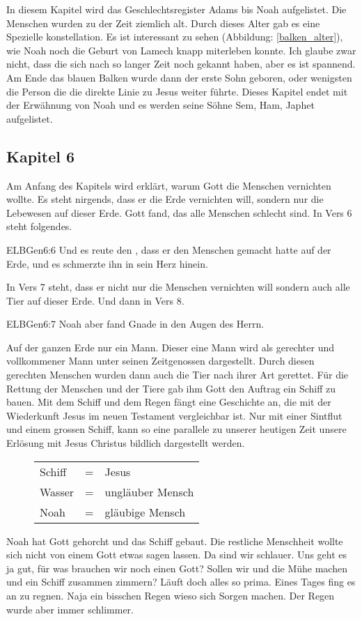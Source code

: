 In diesem Kapitel wird das Geschlechtsregister Adams bis Noah aufgelistet. Die Menschen wurden zu der Zeit ziemlich alt. Durch dieses Alter gab es eine Spezielle konstellation.
Es ist interessant zu sehen (Abbildung: \ref{balken_alter}), wie Noah noch die Geburt von Lamech knapp miterleben konnte. Ich glaube zwar nicht, dass die sich nach so langer Zeit noch gekannt haben, aber es ist spannend. Am Ende das blauen Balken wurde dann der erste Sohn geboren, oder wenigsten die Person die die direkte Linie zu Jesus weiter führte.
Dieses Kapitel endet mit der Erwähnung von Noah und es werden seine Söhne Sem, Ham, Japhet aufgelistet.
\subsection{Kapitel 6}
Am Anfang des Kapitels wird erklärt, warum Gott die Menschen vernichten wollte. Es steht nirgends, dass er die Erde vernichten will, sondern nur die Lebewesen auf dieser Erde. Gott fand, das alle Menschen schlecht sind. In Vers 6 steht folgendes.
\begin{bibeltext}{ELB}{Gen}{6:6}
	Und es reute den \herr , dass er den Menschen gemacht hatte auf der Erde, und es schmerzte ihn in sein Herz hinein.
\end{bibeltext}
In Vers 7 steht, dass er nicht nur die Menschen vernichten will sondern auch alle Tier auf dieser Erde. Und dann in Vers 8.
\begin{bibeltext}{ELB}{Gen}{6:7}
	Noah aber fand Gnade in den Augen des Herrn.
\end{bibeltext}
Auf der ganzen Erde nur ein Mann. Dieser eine Mann wird als gerechter und vollkommener Mann unter seinen Zeitgenossen dargestellt. Durch diesen gerechten Menschen wurden dann auch die Tier nach ihrer Art gerettet. Für die Rettung der Menschen und der Tiere gab ihm Gott den Auftrag ein Schiff zu bauen. Mit dem Schiff und dem Regen fängt eine Geschichte an, die mit der Wiederkunft Jesus im neuen Testament vergleichbar ist. Nur mit einer Sintflut und einem grossen Schiff, kann so eine parallele zu unserer heutigen Zeit unsere Erlösung mit Jesus Christus bildlich dargestellt werden.
\begin{figure}[ht]
	\begin{tabular}{lcl}
		Schiff & = & Jesus            \\
		Wasser & = & ungläuber Mensch \\
		Noah   & = & gläubige Mensch  \\
	\end{tabular}
\end{figure}
Noah hat Gott gehorcht und das Schiff gebaut. Die restliche Menschheit wollte sich nicht von einem Gott etwas sagen lassen. Da sind wir schlauer. Uns geht es ja gut, für was brauchen wir noch einen Gott? Sollen wir und die Mühe machen und ein Schiff zusammen zimmern? Läuft doch alles so prima. Eines Tages fing es an zu regnen. Naja ein bisschen Regen wieso sich Sorgen machen. Der Regen wurde aber immer schlimmer.

